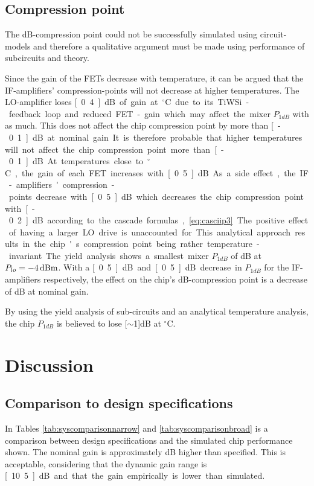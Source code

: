 		\subsection{Compression point}
		The \unit[1]{dB}-compression point could not be successfully simulated using circuit-models and therefore a qualitative argument must be made using performance of subcircuits and theory.
		
		Since the gain of the FETs decrease with temperature, it can be argued that the IF-amplifiers' compression-points will not decrease at higher temperatures. The LO-amplifier loses \unit[0.4]{dB} of gain at \unit[55]{$^\circ$C} due to its TiWSi-feedback loop and reduced FET-gain which may affect the mixer $P_{1dB}$ with as much. This does not affect the chip compression point by more than \unit[-0.1]{dB} at nominal gain. It is therefore probable that higher temperatures will not affect the chip compression point more than \unit[-0.1]{dB}. 
		
		At temperatures close to \unit[-40]{$^\circ$C}, the gain of each FET increases with \unit[0.5]{dB}. As a side effect, the IF-amplifiers' compression-points decrease with \unit[0.5]{dB} which decreases the chip compression point with \unit[-0.2]{dB} according to the cascade formulas, \autoref{eq:casciip3}. The positive effect of having a larger LO drive is unaccounted for.	This analytical approach results in the chip's compression point being rather temperature-invariant. The yield analysis shows a smallest mixer $P_{1dB}$ of \unit[10]{dB} at $P_{lo}=\unit[-4]{dBm}$. With a \unit[0.5]{dB} and \unit[0.5]{dB} decrease in $P_{1dB}$ for the IF-amplifiers respectively, the effect on the chip's \unit[1]{dB}-compression point is a decrease of \unit[1]{dB} at nominal gain.
		
		By using the yield analysis of sub-circuits and an analytical temperature analysis, the chip $P_{1dB}$ is believed to lose \unit[$\sim$1]{dB} at \unit[-40]{$^\circ$C}.

	
	\section{Discussion}
		\subsection{Comparison to design specifications}
			In Tables \ref{tab:syscomparisonnarrow} and \ref{tab:syscomparisonbroad} is a comparison between design specifications and the simulated chip performance shown. The nominal gain is approximately \unit[1]{dB} higher than specified. This is acceptable, considering that the dynamic gain range is \unit[10.5]{dB} and that the gain empirically is lower than simulated.
			
